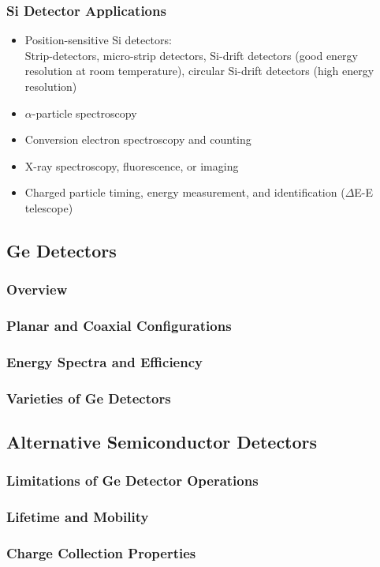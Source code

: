 \subsubsection{Si Detector Applications}
\begin{itemize}
    \item Position-sensitive Si detectors:\\
    Strip-detectors, micro-strip detectors, Si-drift detectors (good energy resolution at room temperature), circular Si-drift detectors (high energy resolution)
    \item $\alpha$-particle spectroscopy
    \item Conversion electron spectroscopy and counting
    \item X-ray spectroscopy, fluorescence, or imaging
    \item Charged particle timing, energy measurement, and identification ($\Delta$E-E telescope)
\end{itemize}

\subsection{Ge Detectors}
\subsubsection{Overview}
\subsubsection{Planar and Coaxial Configurations}
\subsubsection{Energy Spectra and Efficiency}
\subsubsection{Varieties of Ge Detectors}

\subsection{Alternative Semiconductor Detectors}
\subsubsection{Limitations of Ge Detector Operations}
\subsubsection{Lifetime and Mobility}
\subsubsection{Charge Collection Properties}